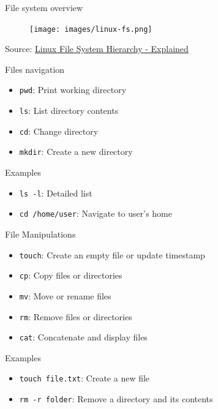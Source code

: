 \documentclass{beamer}
\begin{document}
\begin{frame}{File system overview}
  \begin{figure}[h]
    \texttt{[image: images/linux-fs.png]}
  \end{figure}

  \footnotesize Source: \href{https://blog.fourninecloud.com/linux-file-system-hierarchy-explained-1d80b2cee03c}{Linux File System Hierarchy - Explained}
\end{frame}

\begin{frame}{Files navigation}
  \begin{itemize}
    \item \texttt{pwd}: Print working directory
    \item \texttt{ls}: List directory contents
    \item \texttt{cd}: Change directory
    \item \texttt{mkdir}: Create a new directory
  \end{itemize}
  \begin{exampleblock}{Examples}
    \begin{itemize}
      \item \texttt{ls -l}: Detailed list
      \item \texttt{cd /home/user}: Navigate to user's home
    \end{itemize}
  \end{exampleblock}
\end{frame}

\begin{frame}{File Manipulations}
  \begin{itemize}
    \item \texttt{touch}: Create an empty file or update timestamp
    \item \texttt{cp}: Copy files or directories
    \item \texttt{mv}: Move or rename files
    \item \texttt{rm}: Remove files or directories
    \item \texttt{cat}: Concatenate and display files
  \end{itemize}
  \begin{exampleblock}{Examples}
    \begin{itemize}
      \item \texttt{touch file.txt}: Create a new file
      \item \texttt{rm -r folder}: Remove a directory and its contents
    \end{itemize}
  \end{exampleblock}
\end{frame}
\end{document}
